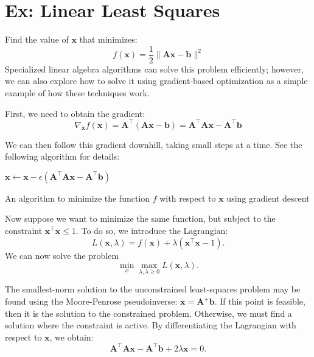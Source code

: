 \documentclass[11pt, twocolumn]{report}
\begin{document}
\section{Ex: Linear Least Squares}
Find the value of $\bm{x}$ that minimizes:
\begin{equation}
  f(\bm{x}) = \frac{1}{2} \| \bm{Ax} - \bm{b} \|^2
\end{equation}
Specialized linear algebra algorithms can solve this problem efficiently;
however, we can also explore how to solve it using gradient-based optimization
as a simple example of how these techniques work.

First, we need to obtain the gradient:
\begin{equation}
  \nabla_{\bm{x}} f(\bm{x}) = \bm{A}^\intercal (\bm{Ax} - \bm{b}) 
  = \bm{A}^\intercal\bm{Ax} - \bm{A}^\intercal\bm{b}
\end{equation}

We can then follow this gradient downhill, taking small steps at a time. See
the following algorithm for details:
\begin{algorithm}
   {
    $\bm{x} \leftarrow \bm{x} - \epsilon(\bm{A}^\intercal\bm{Ax} - \bm{A}^\intercal\bm{b})$
  }
  \caption{An algorithm to minimize the function $f$ with respect to $\bm{x}$
    using gradient descent}
\end{algorithm}

Now suppose we want to minimize the same function, but subject to the
constraint $\bm{x}^\intercal\bm{x} \leq 1$. To do so, we introduce the
Lagrangian:
\begin{equation}
  L(\bm{x},\lambda) = f(\bm{x}) + \lambda(\bm{x}^\intercal\bm{x} - 1).
\end{equation}
We can now solve the problem
\begin{equation}
  \min_x \max_{\lambda, \lambda \geq 0} L(\bm{x}, \lambda).
\end{equation}

The smallest-norm solution to the unconstrained least-squares problem may be
found using the Moore-Penrose pseudoinverse: $\bm{x} = \bm{A}^+\bm{b}$. If this
point is feasible, then it is the solution to the constrained problem.
Otherwise, we must find a solution where the constraint is active. By
differentiating the Lagrangian with respect to $\bm{x}$, we obtain:
\begin{equation}
  \bm{A}^\intercal\bm{Ax} - \bm{A}^\intercal\bm{b} + 2\lambda\bm{x} = 0.
\end{equation}
\end{document}
